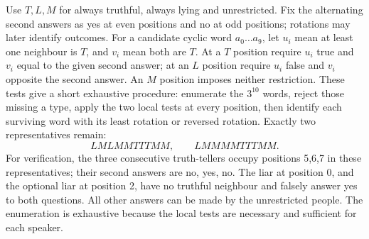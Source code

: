 Use $T,L,M$ for always truthful, always lying and unrestricted. Fix the alternating second answers as yes at even positions and no at odd positions; rotations may later identify outcomes. For a candidate cyclic word $a_0\ldots a_9$, let $u_i$ mean at least one neighbour is $T$, and $v_i$ mean both are $T$. At a $T$ position require $u_i$ true and $v_i$ equal to the given second answer; at an $L$ position require $u_i$ false and $v_i$ opposite the second answer. An $M$ position imposes neither restriction.
These tests give a short exhaustive procedure: enumerate the $3^{10}$ words, reject those missing a type, apply the two local tests at every position, then identify each surviving word with its least rotation or reversed rotation. Exactly two representatives remain:
\[\boxed{LMLMMTTTMM,\qquad LMMMMTTTMM}.\]
For verification, the three consecutive truth-tellers occupy positions 5,6,7 in these representatives; their second answers are no, yes, no. The liar at position 0, and the optional liar at position 2, have no truthful neighbour and falsely answer yes to both questions. All other answers can be made by the unrestricted people. The enumeration is exhaustive because the local tests are necessary and sufficient for each speaker.
